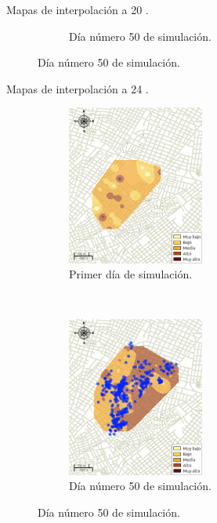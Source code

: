 \begin{frame}[t]{Mapas de interpolación a 20 \textcelsius.}
\begin{figure}
\begin{subfigure}[b]{0.45\textwidth}
        \caption{Día número 50 de simulación.}
    \end{subfigure}
    \end{figure}
\end{frame}

\begin{frame}[t]{Mapas de interpolación a 24 \textcelsius.}
    \begin{figure}
    \begin{subfigure}[b]{0.45\textwidth}
        \includegraphics[width=4.5cm]{../book/capitulo-6/graphics/raster/temp-24-0.png}
        \caption{ Primer día de simulación.}
    \end{subfigure}
    ~~~~
    \begin{subfigure}[b]{0.45\textwidth}
        \includegraphics[width=4.5cm]{../book/capitulo-6/graphics/raster/temp-24-49.png}
        \caption{Día número 50 de simulación.}
    \end{subfigure}
    \end{figure}
\end{frame}

